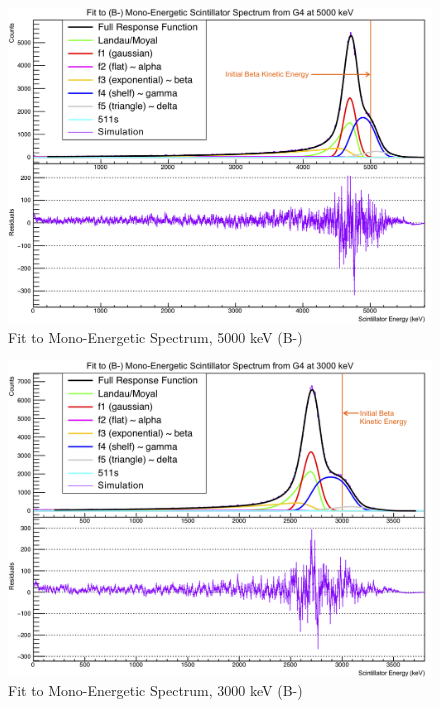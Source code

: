 \begin{figure}[h!!tb]
	\centering
	\includegraphics[width=.999\linewidth]
	{Figures/MonoFit_5000.png}
	\caption[Fit to Mono-Energetic Spectrum, 5000 keV]{Fit to Mono-Energetic Spectrum, 5000 keV (B-)}	
	\label{fig:lineshape_5000}
\end{figure}
\begin{figure}[h!!tb]
	\centering
	\includegraphics[width=.999\linewidth]
	{Figures/MonoFit_3000.png}
	\caption[Fit to Mono-Energetic Spectrum, 3000 keV]{Fit to Mono-Energetic Spectrum, 3000 keV (B-)}	
	\label{fig:lineshape_3000}
\end{figure}
